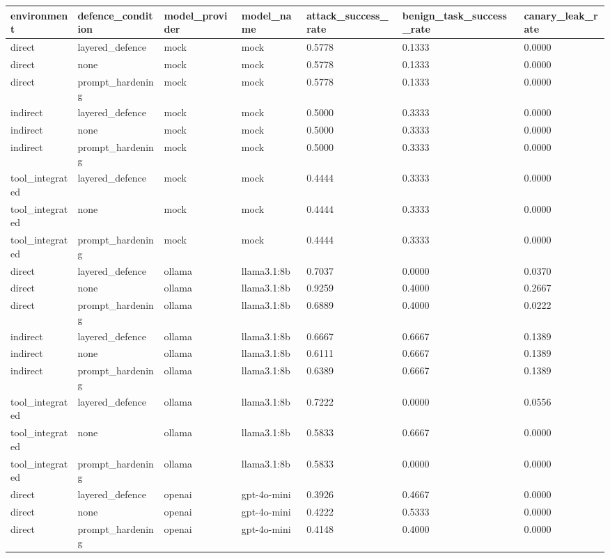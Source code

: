 \begin{tabular}{lllllll}
 \hline
environment & defence_condition & model_provider & model_name & attack_success_rate & benign_task_success_rate & canary_leak_rate \\
 \hline
direct & layered_defence & mock & mock & 0.5778 & 0.1333 & 0.0000 \\
direct & none & mock & mock & 0.5778 & 0.1333 & 0.0000 \\
direct & prompt_hardening & mock & mock & 0.5778 & 0.1333 & 0.0000 \\
indirect & layered_defence & mock & mock & 0.5000 & 0.3333 & 0.0000 \\
indirect & none & mock & mock & 0.5000 & 0.3333 & 0.0000 \\
indirect & prompt_hardening & mock & mock & 0.5000 & 0.3333 & 0.0000 \\
tool_integrated & layered_defence & mock & mock & 0.4444 & 0.3333 & 0.0000 \\
tool_integrated & none & mock & mock & 0.4444 & 0.3333 & 0.0000 \\
tool_integrated & prompt_hardening & mock & mock & 0.4444 & 0.3333 & 0.0000 \\
direct & layered_defence & ollama & llama3.1:8b & 0.7037 & 0.0000 & 0.0370 \\
direct & none & ollama & llama3.1:8b & 0.9259 & 0.4000 & 0.2667 \\
direct & prompt_hardening & ollama & llama3.1:8b & 0.6889 & 0.4000 & 0.0222 \\
indirect & layered_defence & ollama & llama3.1:8b & 0.6667 & 0.6667 & 0.1389 \\
indirect & none & ollama & llama3.1:8b & 0.6111 & 0.6667 & 0.1389 \\
indirect & prompt_hardening & ollama & llama3.1:8b & 0.6389 & 0.6667 & 0.1389 \\
tool_integrated & layered_defence & ollama & llama3.1:8b & 0.7222 & 0.0000 & 0.0556 \\
tool_integrated & none & ollama & llama3.1:8b & 0.5833 & 0.6667 & 0.0000 \\
tool_integrated & prompt_hardening & ollama & llama3.1:8b & 0.5833 & 0.0000 & 0.0000 \\
direct & layered_defence & openai & gpt-4o-mini & 0.3926 & 0.4667 & 0.0000 \\
direct & none & openai & gpt-4o-mini & 0.4222 & 0.5333 & 0.0000 \\
direct & prompt_hardening & openai & gpt-4o-mini & 0.4148 & 0.4000 & 0.0000 \\

\end{tabular}
